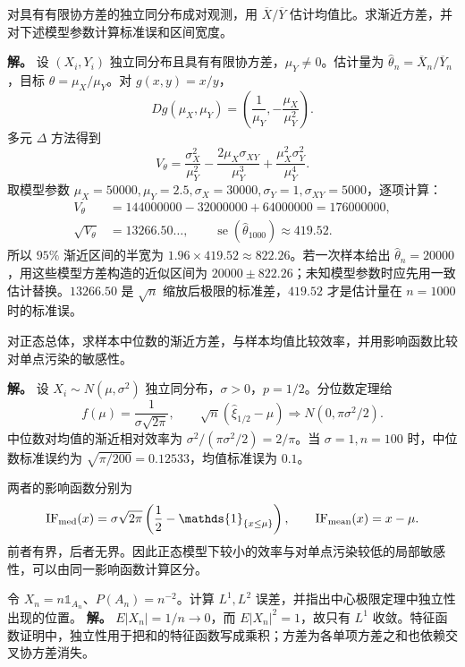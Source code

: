 \begin{exbox}[成对观测的比值估计]
对具有有限协方差的独立同分布成对观测，用 $\overline X/\overline Y$ 估计均值比。求渐近方差，并对下述模型参数计算标准误和区间宽度。

\textbf{解。} 设 $(X_i,Y_i)$ 独立同分布且具有有限协方差，$\mu_Y\ne0$。估计量为 $\widehat\theta_n=\overline X_n/\overline Y_n$，目标 $\theta=\mu_X/\mu_Y$。对 $g(x,y)=x/y$，
\[
 Dg(\mu_X,\mu_Y)=\left(\frac1{\mu_Y},-\frac{\mu_X}{\mu_Y^2}\right).
\]
多元 $\Delta$ 方法得到
\[
 V_\theta=\frac{\sigma_X^2}{\mu_Y^2}
 -\frac{2\mu_X\sigma_{XY}}{\mu_Y^3}
 +\frac{\mu_X^2\sigma_Y^2}{\mu_Y^4}.
\]
取模型参数 $\mu_X=50000,\mu_Y=2.5,\sigma_X=30000,\sigma_Y=1,\sigma_{XY}=5000$，逐项计算：
\begin{align*}
 V_\theta&=144000000-32000000+64000000=176000000,\\
 \sqrt{V_\theta}&=13266.50\ldots,\qquad
 \operatorname{se}(\widehat\theta_{1000})\approx419.52.
\end{align*}
所以 $95\%$ 渐近区间的半宽为 $1.96\times419.52\approx822.26$。若一次样本给出 $\widehat\theta_n=20000$，用这些模型方差构造的近似区间为 $20000\pm822.26$；未知模型参数时应先用一致估计替换。$13266.50$ 是 $\sqrt n$ 缩放后极限的标准差，$419.52$ 才是估计量在 $n=1000$ 时的标准误。
\end{exbox}

\begin{exbox}[正态中位数与均值的效率]
对正态总体，求样本中位数的渐近方差，与样本均值比较效率，并用影响函数比较对单点污染的敏感性。

\textbf{解。} 设 $X_i\sim N(\mu,\sigma^2)$ 独立同分布，$\sigma>0$，$p=1/2$。分位数定理给
\[
 f(\mu)=\frac1{\sigma\sqrt{2\pi}},\qquad
 \sqrt n(\widehat\xi_{1/2}-\mu)\Rightarrow N(0,\pi\sigma^2/2).
\]
中位数对均值的渐近相对效率为 $\sigma^2/(\pi\sigma^2/2)=2/\pi$。当 $\sigma=1,n=100$ 时，中位数标准误约为 $\sqrt{\pi/200}=0.12533$，均值标准误为 $0.1$。

两者的影响函数分别为
\[
 \mathrm{IF}_{\rm med}(x)=\sigma\sqrt{2\pi}\left(\frac12-\mathds{1}_{\{x\le\mu\}}\right),
 \qquad \mathrm{IF}_{\rm mean}(x)=x-\mu.
\]
前者有界，后者无界。因此正态模型下较小的效率与对单点污染较低的局部敏感性，可以由同一影响函数计算区分。
\end{exbox}


\begin{workedexample}
令 $X_n=n\mathds{1}_{A_n}$、$P(A_n)=n^{-2}$。计算 $L^1,L^2$ 误差，并指出中心极限定理中独立性出现的位置。
\textbf{解。} $E|X_n|=1/n\to0$，而 $E|X_n|^2=1$，故只有 $L^1$ 收敛。特征函数证明中，独立性用于把和的特征函数写成乘积；方差为各单项方差之和也依赖交叉协方差消失。
\end{workedexample}

